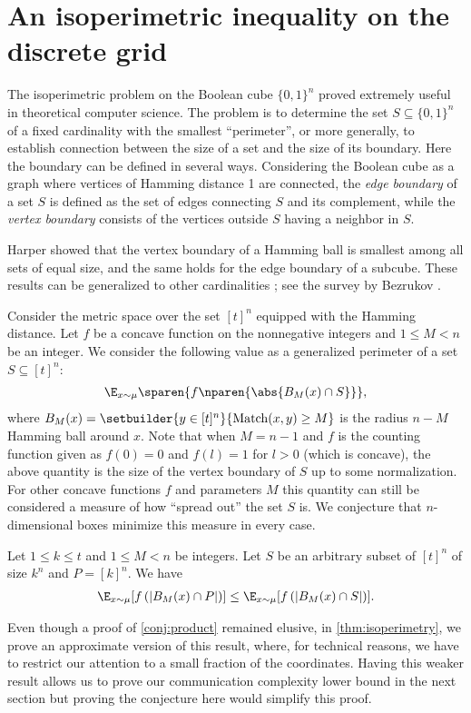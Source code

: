 \section{An isoperimetric inequality on the discrete grid}
\label{sec:disj:isoperimetry}

The isoperimetric problem on the Boolean cube $\{0,1\}^n$ proved
extremely useful in theoretical computer science. The problem is
to determine the set $S\subseteq \{0,1\}^n$ of a fixed
cardinality with the smallest ``perimeter'', or more generally,
to establish connection between the size of a set and the size
of its boundary. Here the boundary can be defined in several
ways. Considering the Boolean cube as a graph where vertices of
Hamming distance 1 are connected, the {\em edge boundary} of a
set $S$ is defined as the set of edges connecting $S$ and its
complement, while the {\em vertex boundary} consists of the
vertices outside $S$ having a neighbor in $S$.

Harper \cite{Harper1964} showed that the vertex boundary of a
Hamming ball is smallest among all sets of equal size, and the
same holds for the edge boundary of a subcube. These results can
be generalized to other cardinalities \cite{Hart1976}; see the
survey by Bezrukov \cite{Bezrukov1994}.

Consider the metric space over the set $[t]^n$ equipped 
with the Hamming distance.
Let $f$ be a concave function on the nonnegative integers 
and $1\le M<n$ be an integer. 
We consider the following
value as a generalized perimeter of a set $S\subseteq[t]^n$:
\begin{align*}
\E_{x\sim\mu}\sparen{f\nparen{\abs{B_M(x)\cap S}}},
\end{align*}
where $B_M(x)=\setbuilder{y\in[t]^n}{\Match(x,y)\ge M}$ is the radius
$n-M$ Hamming ball around $x$. Note that when $M=n-1$ and $f$ is
the counting function given as $f(0)=0$ and $f(l)=1$ for $l>0$
(which is concave), the above quantity is the size of the vertex 
boundary of $S$ up to some normalization. For other concave functions
$f$ and parameters $M$ this quantity can still be considered a
measure of how ``spread out'' the set $S$ is. We conjecture that
$n$-dimensional boxes minimize this measure in every case.

\begin{conjecture}
\label{conj:product}
Let $1\le k\le t$ and $1\le M<n$ be integers. 
Let $S$ be an arbitrary subset of $[t]^n$ of size $k^n$ and 
$P=[k]^n$. We have
\begin{align*}
\E_{x\sim\mu}[f\left(\left|B_M(x)\cap P\right|\right)]\leq
\E_{x\sim\mu}[f\left(\left|B_M(x)\cap S\right|\right)].
\end{align*}
\end{conjecture}
Even though a proof of \autoref{conj:product} remained elusive,
in \autoref{thm:isoperimetry}, we prove an approximate version
of this result, where, for technical reasons, we have to
restrict our attention to a small fraction of the coordinates.
Having this weaker result allows us to prove our communication
complexity lower bound in the next section but proving the
conjecture here would simplify this proof.

